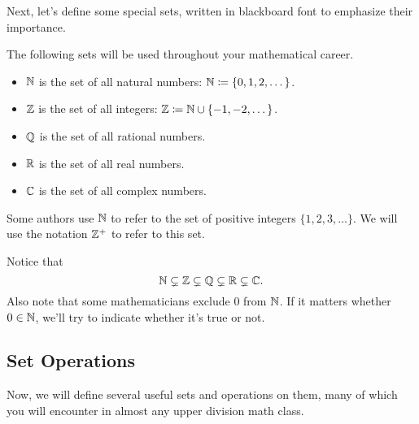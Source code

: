 \documentclass[../main.tex]{subfiles}
\begin{document}
Next, let's define some special sets, written in blackboard font to emphasize their importance.
\begin{definition}
    The following sets will be used throughout your mathematical career.
    \begin{itemize}
        \item $\mathbb N$ is the set of all natural numbers: $\mathbb N \coloneqq \{0, 1, 2, \dots\}$.
        \item $\mathbb Z$ is the set of all integers: $\mathbb Z \coloneqq \mathbb N \cup \{-1, -2, \dots\}$.
        \item $\mathbb Q$ is the set of all rational numbers.
        \item $\mathbb R$ is the set of all real numbers.
        \item $\mathbb C$ is the set of all complex numbers.
    \end{itemize}
\end{definition}
\begin{warn}
    Some authors use $\mathbb N$ to refer to the set of positive integers $\{1,2,3,\ldots\}$. We will use the notation $\mathbb Z^+$ to refer to this set.
\end{warn}
Notice that
\[\mathbb N \subsetneq \mathbb Z \subsetneq \mathbb Q \subsetneq \mathbb R \subsetneq \mathbb C.\]
Also note that some mathematicians exclude 0 from $\mathbb N$. If it matters whether $0 \in \mathbb N$, we'll try to indicate whether it's true or not.

\subsection{Set Operations}
Now, we will define several useful sets and operations on them, many of which you will encounter in almost any upper division math class.
\end{document}

